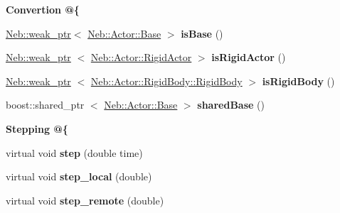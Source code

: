 \begin{Indent}{\bf \-Convertion @\{}\par
\begin{DoxyCompactItemize}
\item 
\hypertarget{classNeb_1_1Actor_1_1Base_ae6f52ed167597ae415bc07a4d195eb48}{\hyperlink{classNeb_1_1weak__ptr}{\-Neb\-::weak\-\_\-ptr}$<$ \hyperlink{classNeb_1_1Actor_1_1Base}{\-Neb\-::\-Actor\-::\-Base} $>$ {\bfseries is\-Base} ()}\label{classNeb_1_1Actor_1_1Base_ae6f52ed167597ae415bc07a4d195eb48}

\item 
\hypertarget{classNeb_1_1Actor_1_1Base_a9ceae55c5cdcd96ef35f265a50fd7a7f}{\hyperlink{classNeb_1_1weak__ptr}{\-Neb\-::weak\-\_\-ptr}\*
$<$ \hyperlink{classNeb_1_1Actor_1_1RigidActor}{\-Neb\-::\-Actor\-::\-Rigid\-Actor} $>$ {\bfseries is\-Rigid\-Actor} ()}\label{classNeb_1_1Actor_1_1Base_a9ceae55c5cdcd96ef35f265a50fd7a7f}

\item 
\hypertarget{classNeb_1_1Actor_1_1Base_a96ca5aa2dd09f282a209a2272bcb00c2}{\hyperlink{classNeb_1_1weak__ptr}{\-Neb\-::weak\-\_\-ptr}\*
$<$ \hyperlink{classNeb_1_1Actor_1_1RigidBody_1_1RigidBody}{\-Neb\-::\-Actor\-::\-Rigid\-Body\-::\-Rigid\-Body} $>$ {\bfseries is\-Rigid\-Body} ()}\label{classNeb_1_1Actor_1_1Base_a96ca5aa2dd09f282a209a2272bcb00c2}

\item 
\hypertarget{classNeb_1_1Actor_1_1Base_ab3057dd41eaf5ab21879d005366eb53b}{boost\-::shared\-\_\-ptr\*
$<$ \hyperlink{classNeb_1_1Actor_1_1Base}{\-Neb\-::\-Actor\-::\-Base} $>$ {\bfseries shared\-Base} ()}\label{classNeb_1_1Actor_1_1Base_ab3057dd41eaf5ab21879d005366eb53b}

\end{DoxyCompactItemize}
\end{Indent}
\begin{Indent}{\bf \-Stepping @\{}\par
\begin{DoxyCompactItemize}
\item 
\hypertarget{classNeb_1_1Actor_1_1Base_aa3a471076f4b9a9df943b420aae8a03f}{virtual void {\bfseries step} (double time)}\label{classNeb_1_1Actor_1_1Base_aa3a471076f4b9a9df943b420aae8a03f}

\item 
\hypertarget{classNeb_1_1Actor_1_1Base_a2a56ccbf85e58c0b86c018cb786cd19e}{virtual void {\bfseries step\-\_\-local} (double)}\label{classNeb_1_1Actor_1_1Base_a2a56ccbf85e58c0b86c018cb786cd19e}

\item 
\hypertarget{classNeb_1_1Actor_1_1Base_a12e2b21526617d9cd24303289f3c833a}{virtual void {\bfseries step\-\_\-remote} (double)}\label{classNeb_1_1Actor_1_1Base_a12e2b21526617d9cd24303289f3c833a}

\end{DoxyCompactItemize}
\end{Indent}
